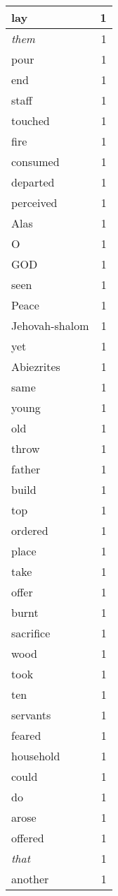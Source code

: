 \begin{center}
\begin{longtable}{l|r}
lay & 1\\ \hline 
\emph{them} & 1\\ \hline 
pour & 1\\ \hline 
end & 1\\ \hline 
staff & 1\\ \hline 
touched & 1\\ \hline 
fire & 1\\ \hline 
consumed & 1\\ \hline 
departed & 1\\ \hline 
perceived & 1\\ \hline 
Alas & 1\\ \hline 
O & 1\\ \hline 
GOD & 1\\ \hline 
seen & 1\\ \hline 
Peace & 1\\ \hline 
Jehovah-shalom & 1\\ \hline 
yet & 1\\ \hline 
Abiezrites & 1\\ \hline 
same & 1\\ \hline 
young & 1\\ \hline 
old & 1\\ \hline 
throw & 1\\ \hline 
father & 1\\ \hline 
build & 1\\ \hline 
top & 1\\ \hline 
ordered & 1\\ \hline 
place & 1\\ \hline 
take & 1\\ \hline 
offer & 1\\ \hline 
burnt & 1\\ \hline 
sacrifice & 1\\ \hline 
wood & 1\\ \hline 
took & 1\\ \hline 
ten & 1\\ \hline 
servants & 1\\ \hline 
feared & 1\\ \hline 
household & 1\\ \hline 
could & 1\\ \hline 
do & 1\\ \hline 
arose & 1\\ \hline 
offered & 1\\ \hline 
\emph{that} & 1\\ \hline 
another & 1\\ \hline 

\end{longtable}
\end{center}
